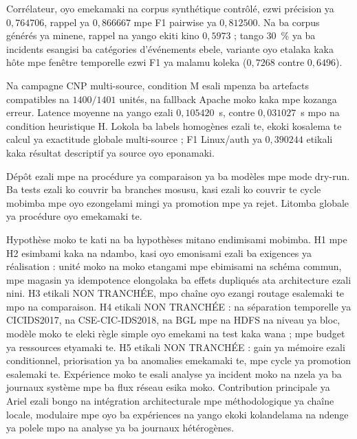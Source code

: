 Corrélateur, oyo emekamaki na corpus synthétique contrôlé, ezwi précision
ya $0{,}764706$, rappel ya $0{,}866667$ mpe F1 pairwise ya
$0{,}812500$. Na ba corpus générés ya minene, rappel na yango ekiti kino
$0{,}5973$ ; tango 30~\% ya ba incidents esangisi ba catégories
d'événements ebele, variante oyo etalaka kaka hôte mpe fenêtre temporelle
ezwi F1 ya malamu koleka ($0{,}7268$ contre $0{,}6496$).

Na campagne CNP multi-source, condition M esali mpenza ba
artefacts compatibles na $1400/1401$ unités, na fallback Apache moko
kaka mpe kozanga erreur. Latence moyenne na yango ezali
$0{,}105420$~s, contre $0{,}031027$~s mpo na condition heuristique H.
Lokola ba labels homogènes ezali te, ekoki kosalema te calcul ya
exactitude globale multi-source ; F1 Linux/auth ya $0{,}390244$ etikali
kaka résultat descriptif ya source oyo eponamaki.

Dépôt ezali mpe na procédure ya comparaison ya ba modèles mpe mode
dry-run. Ba tests ezali ko couvrir ba branches mosusu, kasi ezali ko
couvrir te cycle mobimba mpe oyo ezongelami mingi ya promotion mpe ya
rejet. Litomba globale ya procédure oyo emekamaki te.

Hypothèse moko te kati na ba hypothèses mitano endimisami mobimba. H1 mpe
H2 esimbami kaka na ndambo, kasi oyo emonisami ezali ba exigences ya
réalisation : unité moko na moko etangami mpe ebimisami na schéma commun,
mpe magasin ya idempotence elongolaka ba effets dupliqués ata architecture
ezali nini. H3 etikali NON TRANCHÉE, mpo chaîne oyo ezangi routage
esalemaki te mpo na comparaison. H4 etikali NON TRANCHÉE : na séparation temporelle ya CICIDS2017, na CSE-CIC-IDS2018, na BGL mpe na HDFS na niveau ya bloc, modèle moko te eleki règle simple oyo emekami na test kaka wana ; mpe budget ya ressources etyamaki te. H5 etikali NON TRANCHÉE : gain ya mémoire ezali conditionnel, priorisation ya ba anomalies emekamaki te, mpe cycle ya promotion esalemaki te.
Expérience moko te esali analyse ya incident moko na nzela ya ba journaux
système mpe ba flux réseau esika moko.
Contribution principale ya Ariel \logminer{} ezali bongo na intégration
architecturale mpe méthodologique ya chaîne locale, modulaire
mpe oyo ba expériences na yango ekoki kolandelama na ndenge ya polele
mpo na analyse ya ba journaux hétérogènes.
